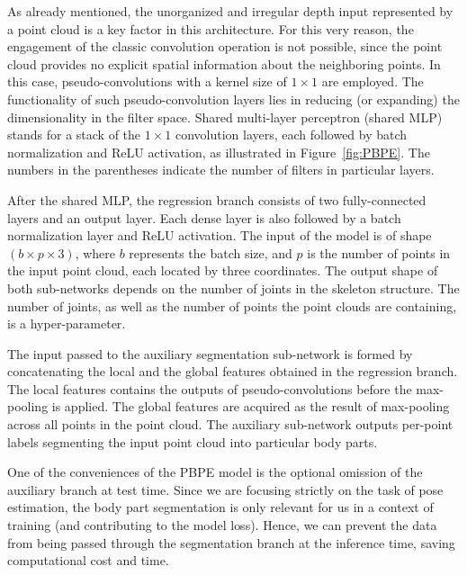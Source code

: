 \noindent
As already mentioned, the unorganized and irregular depth input represented by a point cloud is a key factor in this architecture. For this very reason, the engagement of the classic convolution operation is not possible, since the point cloud provides no explicit spatial information about the neighboring points. In this case, pseudo-convolutions with a kernel size of $1\times1$ are employed. The functionality of such pseudo-convolution layers lies in reducing (or expanding) the dimensionality in the filter space. Shared multi-layer perceptron (shared MLP) stands for a stack of the $1 \times 1$ convolution layers, each followed by batch normalization and ReLU activation, as illustrated in Figure~\ref{fig:PBPE}. The numbers in the parentheses indicate the number of filters in particular layers.\par
\vspace{5mm}
\noindent After the shared MLP, the regression branch consists of two fully-connected layers and an output layer. Each dense layer is also followed by a batch normalization layer and ReLU activation. The input of the model is of shape $(b \times p \times 3)$, where $b$ represents the batch size, and $p$ is the number of points in the input point cloud, each located by three coordinates. The output shape of both sub-networks depends on the number of joints in the skeleton structure. The number of joints, as well as the number of points the point clouds are containing, is a hyper-parameter.\par
\vspace{5mm}
\noindent The input passed to the auxiliary segmentation sub-network is formed by concatenating the local and the global features obtained in the regression branch. The local features contains the outputs of pseudo-convolutions before the max-pooling is applied. The global features are acquired as the result of max-pooling across all points in the point cloud. The auxiliary sub-network outputs per-point labels segmenting the input point cloud into particular body parts.\par
\vspace{5mm}
\noindent One of the conveniences of the PBPE model is the optional omission of the auxiliary branch at test time. Since we are focusing strictly on the task of pose estimation, the body part segmentation is only relevant for us in a context of training (and contributing to the model loss). Hence, we can prevent the data from being passed through the segmentation branch at the inference time, saving computational cost and time.

